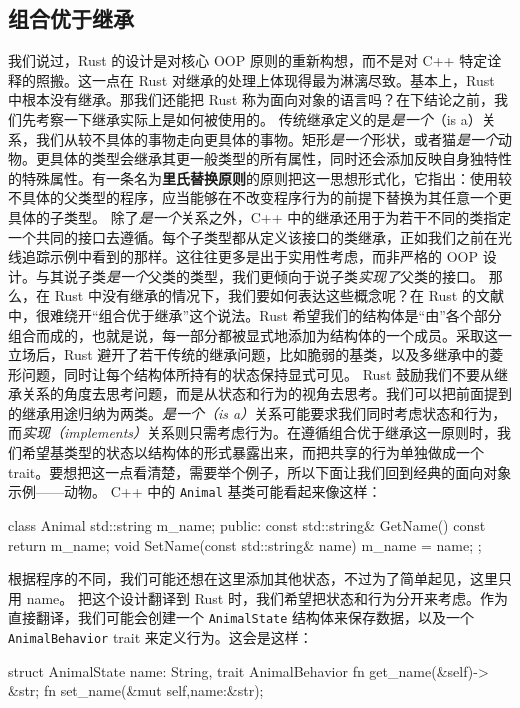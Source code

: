 \subsection{组合优于继承}
\label{idx:idx_f4c09b59}
我们说过，Rust 的设计是对核心 OOP 原则的重新构想，而不是对 C++ 特定诠释的照搬。这一点在 Rust 对继承的处理上体现得最为淋漓尽致。基本上，Rust 中根本没有继承。那我们还能把 Rust 称为面向对象的语言吗？在下结论之前，我们先考察一下继承实际上是如何被使用的。
\label{idx:idx_94ffe9f6}
传统继承定义的是\emph{是一个}（is a）关系，我们从较不具体的事物走向更具体的事物。矩形\emph{是一个}形状，或者猫\emph{是一个}动物。更具体的类型会继承其更一般类型的所有属性，同时还会添加反映自身独特性的特殊属性。有一条名为\textbf{里氏替换原则}的原则把这一思想形式化，它指出：使用较不具体的父类型的程序，应当能够在不改变程序行为的前提下替换为其任意一个更具体的子类型。
除了\emph{是一个}关系之外，C++ 中的继承还用于为若干不同的类指定一个共同的接口去遵循。每个子类型都从定义该接口的类继承，正如我们之前在光线追踪示例中看到的那样。这往往更多是出于实用性考虑，而非严格的 OOP 设计。与其说子类\emph{是一个}父类的类型，我们更倾向于说子类\emph{实现了}父类的接口。
那么，在 Rust 中没有继承的情况下，我们要如何表达这些概念呢？在 Rust 的文献中，很难绕开“组合优于继承”这个说法。Rust 希望我们的结构体是“由”各个部分组合而成的，也就是说，每一部分都被显式地添加为结构体的一个成员。采取这一立场后，Rust 避开了若干传统的继承问题，比如脆弱的基类，以及多继承中的菱形问题，同时让每个结构体所持有的状态保持显式可见。
\label{idx:idx_b866bfbc}
Rust 鼓励我们不要从继承关系的角度去思考问题，而是从状态和行为的视角去思考。我们可以把前面提到的继承用途归纳为两类。\emph{是一个（is a）}关系可能要求我们同时考虑状态和行为，而\emph{实现（implements）}关系则只需考虑行为。在遵循组合优于继承这一原则时，我们希望基类型的状态以结构体的形式暴露出来，而把共享的行为单独做成一个 trait。要想把这一点看清楚，需要举个例子，所以下面让我们回到经典的面向对象示例——动物。
C++ 中的 \texttt{Animal} 基类可能看起来像这样：
\begin{codebox}[rust]
class Animal {
      std::string m_name;
public:
      const std::string& GetName() const { return m_name; }
      void SetName(const std::string& name) { m_name = name; }
};
\end{codebox}
根据程序的不同，我们可能还想在这里添加其他状态，不过为了简单起见，这里只用 name。
把这个设计翻译到 Rust 时，我们希望把状态和行为分开来考虑。作为直接翻译，我们可能会创建一个 \texttt{AnimalState} 结构体来保存数据，以及一个
\texttt{AnimalBehavior} trait 来定义行为。这会是这样：
\begin{codebox}[rust]
struct AnimalState {
      name: String,
}
trait AnimalBehavior {
      fn get_name(&self)-> &str;
      fn set_name(&mut self,name:&str);
}
\end{codebox}
